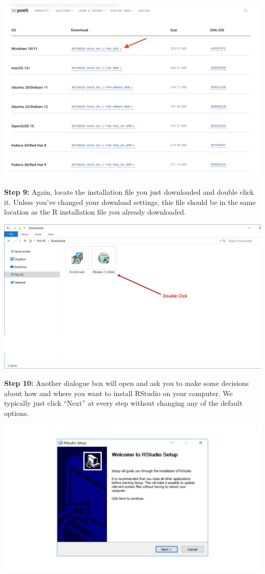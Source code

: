 \documentclass[
  letterpaper,
  DIV=11,
  numbers=noendperiod]{scrreprt}
\begin{document}
\includegraphics{chapters/installing_r_and_rstudio/pc_download_rstudio1.png}

\textbf{Step 9:} Again, locate the installation file you just downloaded
and double click it. Unless you've changed your download settings, this
file should be in the same location as the R installation file you
already downloaded.

\includegraphics{chapters/installing_r_and_rstudio/pc_install_rstudio1.png}

\textbf{Step 10:} Another dialogue box will open and ask you to make
some decisions about how and where you want to install RStudio on your
computer. We typically just click ``Next'' at every step without
changing any of the default options.

\includegraphics{chapters/installing_r_and_rstudio/pc_install_rstudio2.png}
\end{document}
